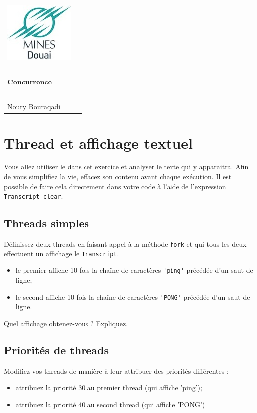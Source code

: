 \documentclass[12pt]{article}
\begin{document}
\vspace*{-3.5cm}
\hspace*{-2.5cm}
\begin{tabular}{lc}
\includegraphics{logoMinesDouai-small} 
& 
\begin{minipage}[b]{15cm}
\begin{center}
{\it TP Programmation par objet}\\~\\
{\Large\bf Concurrence}\\~\\
{\sf Noury Bouraqadi}
\end{center}
\end{minipage}\\
\end{tabular}

\newcommand{\st}[1]{{\small \verb!#1!}} 


\section{Thread et affichage textuel}
Vous allez utiliser le  dans cet exercice et analyser le texte qui y apparaitra. 
Afin de vous simplifiez la vie, effacez son contenu avant chaque exécution.
Il est possible de faire cela directement dans votre code à l'aide de l'expression \st{Transcript clear}.
 
\subsection{Threads simples}
Définissez deux threads en faisant appel à la méthode \st{fork} et qui tous les deux effectuent un affichage le \st{Transcript}.
\begin{itemize}
	\item le premier affiche 10 fois la chaîne de caractères \st{'ping'} précédée d'un saut de ligne;
	\item le second affiche 10 fois la chaîne de caractères \st{'PONG'} précédée d'un saut de ligne.
\end{itemize} 

Quel affichage obtenez-vous ? Expliquez.

\subsection{Priorités de threads}
Modifiez vos threads de manière à leur attribuer des priorités différentes :
\begin{itemize}
	\item attribuez la priorité 30 au premier thread (qui affiche 'ping');
	\item attribuez la priorité 40 au second thread (qui affiche 'PONG')
\end{itemize}
\end{document}
